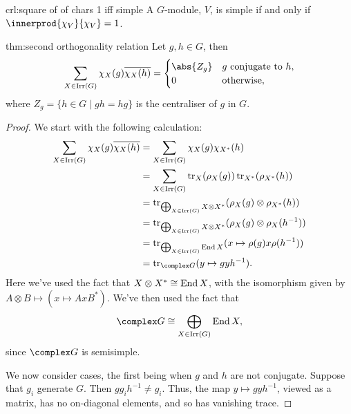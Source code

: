 \begin{crl}{}{crl:square of of chars 1 iff simple}
    A \(G\)-module, \(V\), is simple if and only if \(\innerprod{\chi_V}{\chi_V} = 1\).
\end{crl}

\begin{thm}{}{thm:second orthogonality relation}
    Let \(g, h \in G\), then
    \begin{equation}
        \sum_{X \in \Irr(G)} \chi_X(g) \overline{\chi_X(h)} = 
        \begin{cases}
            \abs{Z_g} & g \text{ conjugate to }h,\\
            0 & \text{otherwise},
        \end{cases}
    \end{equation}
    where \(Z_g = \{h \in G \mid gh = hg\}\) is the centraliser of \(g\) in \(G\).
    \begin{proof}
        We start with the following calculation:
        \begin{align}
            \sum_{X \in \Irr(G)} \chi_X(g) \overline{\chi_X(h)} &= \sum_{X \in \Irr(G)} \chi_X(g) \chi_{X^*}(h)\\
            &= \sum_{X \in \Irr(G)} \tr_X(\rho_X(g)) \tr_{X^*}(\rho_{X^*}(h))\\
            &= \tr_{\bigoplus_{X \in \Irr(G)} X \otimes X^*} (\rho_X(g) \otimes \rho_{X^*}(h))\\
            &= \tr_{\bigoplus_{X \in \Irr(G)} X \otimes X^*} (\rho_X(g) \otimes \rho_X(h^{-1}))\\
            &= \tr_{\bigoplus_{X \in \Irr(G)} \End X} (x \mapsto \rho(g)x\rho(h^{-1}))\\
            &= \tr_{\complex G} (y \mapsto gyh^{-1}).
        \end{align}
        Here we've used the fact that \(X \otimes X^* \cong \operatorname{End} X\), with the isomorphism given by \(A \otimes B \mapsto (x \mapsto AxB^*)\).
        We've then used the fact that
        \begin{equation}
            \complex G \isomorphic \bigoplus_{X \in \Irr(G)} \End X,
        \end{equation}
        since \(\complex G\) is semisimple.
        
        We now consider cases, the first being when \(g\) and \(h\) are not conjugate.
        Suppose that \(g_i\) generate \(G\).
        Then \(gg_ih^{-1} \ne g_i\).
        Thus, the map \(y \mapsto gyh^{-1}\), viewed as a matrix, has no on-diagonal elements, and so has vanishing trace.
        

\end{proof}
\end{thm}
